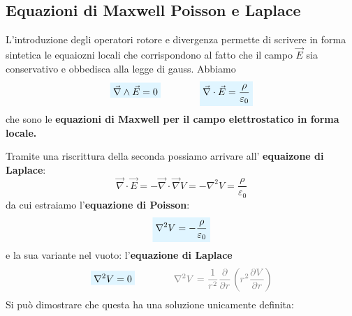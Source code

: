 \documentclass[x11names]{report}
\newcommand{\viola}[1]{%
	\colorbox{myblue}{$\displaystyle #1$}
}
\begin{document}
\subsection{Equazioni di Maxwell Poisson e Laplace}
L'introduzione degli operatori rotore e divergenza permette di scrivere in forma sintetica le equaiozni locali che corrispondono al fatto che il campo \(\vec{E}\) sia conservativo e obbedisca alla legge di gauss. Abbiamo
\begin{equation}
	\viola{\vec{\nabla} \wedge \vec{E} = 0} \qquad \qquad \viola{\vec{\nabla} \cdot \vec{E} = \frac{\rho}{\varepsilon_0}}
\end{equation}
che sono le \textbf{equazioni di Maxwell per il campo elettrostatico in forma locale.} 

Tramite una riscrittura della seconda possiamo arrivare all' \textbf{equaizone di Laplace}:
\[
\vec{\nabla} \cdot \vec{E} = - \vec{\nabla} \cdot \vec{\nabla}V = - \nabla^2V = \frac{\rho}{\varepsilon_0}
\]
da cui estraiamo l'\textbf{equazione di Poisson}:
\begin{equation}
	\viola{\nabla^2V = -\frac{\rho}{\varepsilon_0} }
\end{equation}
e la sua variante nel vuoto: l'\textbf{equazione di Laplace}
\begin{equation}
	\viola{\nabla^2V = 0} \qquad\qquad \textcolor{gray}{\nabla^2V = \frac{1}{r^2}\frac{\partial}{\partial r}\left(r^2\frac{\partial V}{\partial r}\right) }
\end{equation}
Si può dimostrare che questa ha una soluzione unicamente definita:
\end{document}
